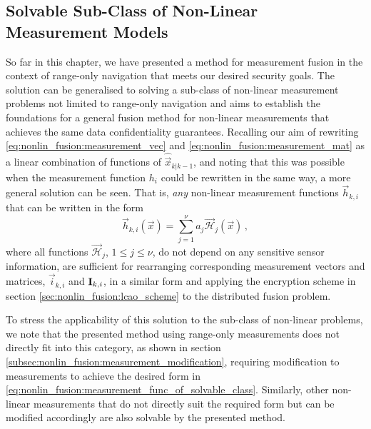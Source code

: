 \subsection{Solvable Sub-Class of Non-Linear Measurement Models}\label{subsec:nonlin_fusion:solvable_nonlin_class}
So far in this chapter, we have presented a method for measurement fusion in the context of range-only navigation that meets our desired security goals. The solution can be generalised to solving a sub-class of non-linear measurement problems not limited to range-only navigation and aims to establish the foundations for a general fusion method for non-linear measurements that achieves the same data confidentiality guarantees. Recalling our aim of rewriting \eqref{eq:nonlin_fusion:measurement_vec} and \eqref{eq:nonlin_fusion:measurement_mat} as a linear combination of functions of $\hat{\vec{x}}_{k|k-1}$, and noting that this was possible when the measurement function $h_i$ could be rewritten in the same way, a more general solution can be seen. That is, \textit{any} non-linear measurement functions $\vec{h}_{k,i}$ that can be written in the form
\begin{equation}\label{eq:nonlin_fusion:measurement_func_of_solvable_class}
    \vec{h}_{k,i}(\vec{x}) = \sum_{j=1}^\nu a_j\vec{\mathcal{H}}_j(\vec{x})\,,
\end{equation}
where all functions $\vec{\mathcal{H}}_j$, $1\leq j\leq \nu$, do not depend on any sensitive sensor information, are sufficient for rearranging corresponding measurement vectors and matrices, $\vec{i}_{k, i}$ and ${{\mathbf{I}}}_{k, i}$, in a similar form and applying the encryption scheme in section \ref{sec:nonlin_fusion:lcao_scheme} to the distributed fusion problem. 

To stress the applicability of this solution to the sub-class of non-linear problems, we note that the presented method using range-only measurements does not directly fit into this category, as shown in section \ref{subsec:nonlin_fusion:measurement_modification}, requiring modification to measurements to achieve the desired form in \eqref{eq:nonlin_fusion:measurement_func_of_solvable_class}. Similarly, other non-linear measurements that do not directly suit the required form but can be modified accordingly are also solvable by the presented method.

% 
% 

